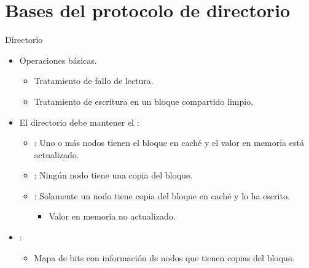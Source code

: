 \section{Bases del protocolo de directorio}

\begin{frame}[t]{Directorio}
\begin{itemize}
  \item Operaciones básicas.
    \begin{itemize}
      \item Tratamiento de fallo de lectura.
      \item Tratamiento de escritura en un bloque compartido limpio.
    \end{itemize}

  \item El directorio debe mantener el :
    \begin{itemize}
      \item {}: 
            Uno o más nodos tienen el bloque en caché y el valor en memoria está actualizado.
      \item {}: 
            Ningún nodo tiene una copia del bloque.
      \item {}: 
            Solamente un nodo tiene copia del bloque en caché y lo ha escrito.
        \begin{itemize}
          \item Valor en memoria no actualizado.
        \end{itemize}
    \end{itemize}

  \item {}:
    \begin{itemize}
      \item Mapa de bits con información de nodos que tienen copias del bloque.
    \end{itemize}
\end{itemize}
\end{frame}


